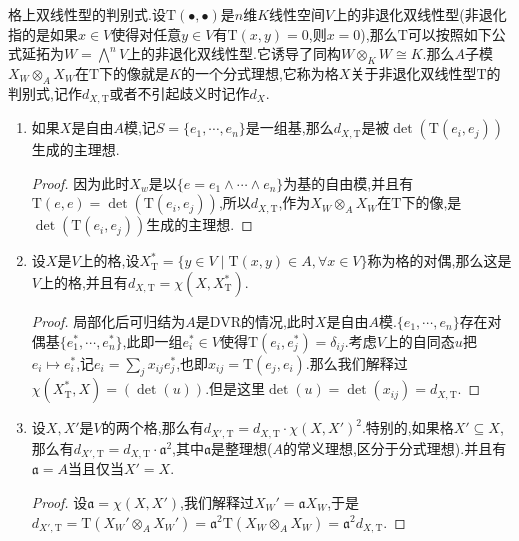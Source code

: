 格上双线性型的判别式.设$\mathrm{T}(\bullet,\bullet)$是$n$维$K$线性空间$V$上的非退化双线性型(非退化指的是如果$x\in V$使得对任意$y\in V$有$\mathrm{T}(x,y)=0$,则$x=0$),那么$\mathrm{T}$可以按照如下公式延拓为$W=\bigwedge^nV$上的非退化双线性型.它诱导了同构$W\otimes_KW\cong K$.那么$A$子模$X_W\otimes_AX_W$在$\mathrm{T}$下的像就是$K$的一个分式理想,它称为格$X$关于非退化双线性型$\mathrm{T}$的判别式,记作$d_{X,\mathrm{T}}$或者不引起歧义时记作$d_X$.
\begin{enumerate}
	\item 如果$X$是自由$A$模,记$S=\{e_1,\cdots,e_n\}$是一组基,那么$d_{X,\mathrm{T}}$是被$\det(\mathrm{T}(e_i,e_j))$生成的主理想.
	\begin{proof}
		
		因为此时$X_w$是以$\{e=e_1\wedge\cdots\wedge e_n\}$为基的自由模,并且有$\mathrm{T}(e,e)=\det(\mathrm{T}(e_i,e_j))$,所以$d_{X,\mathrm{T}}$,作为$X_W\otimes_AX_W$在$\mathrm{T}$下的像,是$\det(\mathrm{T}(e_i,e_j))$生成的主理想.
	\end{proof}
    \item 设$X$是$V$上的格,设$X_{\mathrm{T}}^*=\{y\in V\mid\mathrm{T}(x,y)\in A,\forall x\in V\}$称为格的对偶,那么这是$V$上的格,并且有$d_{X,\mathrm{T}}=\chi(X,X_{\mathrm{T}}^*)$.
    \begin{proof}
    	
    	局部化后可归结为$A$是DVR的情况,此时$X$是自由$A$模.$\{e_1,\cdots,e_n\}$存在对偶基$\{e_1^*,\cdots,e_n^*\}$,此即一组$e_i^*\in V$使得$\mathrm{T}(e_i,e_j^*)=\delta_{ij}$.考虑$V$上的自同态$u$把$e_i\mapsto e_i^*$,记$e_i=\sum_jx_{ij}e_j^*$,也即$x_{ij}=\mathrm{T}(e_j,e_i)$.那么我们解释过$\chi(X_{\mathrm{T}}^*,X)=(\det(u))$.但是这里$\det(u)=\det(x_{ij})=d_{X,\mathrm{T}}$.
    \end{proof}
    \item 设$X,X'$是$V$的两个格,那么有$d_{X',\mathrm{T}}=d_{X,\mathrm{T}}\cdot\chi(X,X')^2$.特别的,如果格$X'\subseteq X$,那么有$d_{X',\mathrm{T}}=d_{X,\mathrm{T}}\cdot\mathfrak{a}^2$,其中$\mathfrak{a}$是整理想($A$的常义理想,区分于分式理想).并且有$\mathfrak{a}=A$当且仅当$X'=X$.
    \begin{proof}
    	
    	设$\mathfrak{a}=\chi(X,X')$,我们解释过$X_W'=\mathfrak{a}X_W$,于是$d_{X',\mathrm{T}}=\mathrm{T}(X_W'\otimes_AX_W')=\mathfrak{a}^2\mathrm{T}(X_W\otimes_AX_W)=\mathfrak{a}^2d_{X,\mathrm{T}}$.
    \end{proof}
\end{enumerate}

